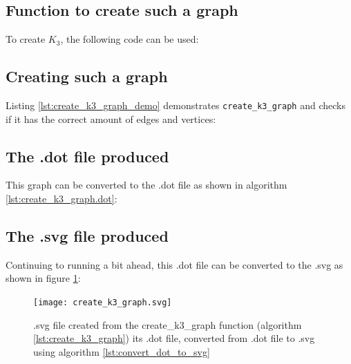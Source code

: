 \subsection{Function to create such a graph}

To create $K_{3}$, the following code can be used:



\subsection{Creating such a graph}

Listing \ref{lst:create_k3_graph_demo} demonstrates 
\verb;create_k3_graph; and checks if it has the correct
amount of edges and vertices:



\subsection{The .dot file produced}
\label{subsec:create_k3_graph.dot}

This graph can be converted to the .dot file as shown in algorithm 
\ref{lst:create_k3_graph.dot}:

%
%
%

\subsection{The .svg file produced}
\label{subsec:create_k3.svg}

Continuing to running a bit ahead, this .dot file can be converted to the
.svg as shown in figure \ref{fig:create_k3_graph.svg}:

\begin{figure}[!htbp]
  \texttt{[image: create\_k3\_graph.svg]}
  \caption{
    .svg file created from the create\_k3\_graph function 
    (algorithm \ref{lst:create_k3_graph}) its .dot file, 
    converted from .dot file to .svg 
    using algorithm \ref{lst:convert_dot_to_svg}
  }
  \label{fig:create_k3_graph.svg}
\end{figure}

